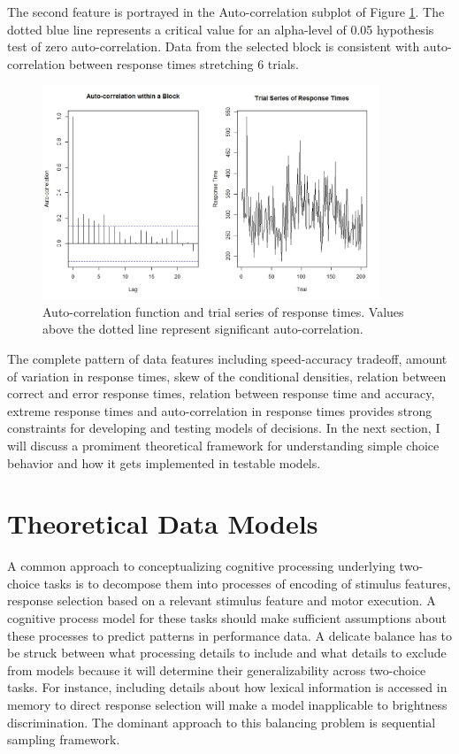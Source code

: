 \documentclass[12pt]{report}
\begin{document}
The second feature is portrayed in the Auto-correlation subplot of Figure \ref{fig:autoacf}. The dotted blue line represents a critical value for an alpha-level of 0.05 hypothesis test of zero auto-correlation. Data from the selected block is consistent with auto-correlation between response times stretching 6 trials. 

%
\begin{figure}
\centering
\includegraphics[width=0.9\textwidth]{Auto_Acf_RRdata}
\caption{Auto-correlation function and trial series of response times. Values above the dotted line represent significant auto-correlation.}
\label{fig:autoacf}
\end{figure}
%

The complete pattern of data features including speed-accuracy tradeoff, amount of variation in response times, skew of the conditional densities, relation between correct and error response times, relation between response time and accuracy, extreme response times and auto-correlation in response times provides strong constraints for developing and testing models of decisions. In the next section, I will discuss a promiment theoretical framework for understanding simple choice behavior and how it gets implemented in testable models.


\section{Theoretical Data Models}

A common approach to conceptualizing cognitive processing underlying two-choice
tasks is to decompose them into processes of encoding of stimulus features, response selection based on a relevant stimulus feature and motor execution. A cognitive process model for these tasks should make sufficient assumptions about these processes to predict patterns in performance
data. A delicate balance has to be struck between what processing details to include
and what details to exclude from models because it will determine their generalizability across two-choice tasks. For instance, including details about how lexical information is accessed in
memory to direct response selection will make a model inapplicable to
brightness discrimination. The dominant approach to this balancing problem
is sequential sampling framework.
    
\end{document}
